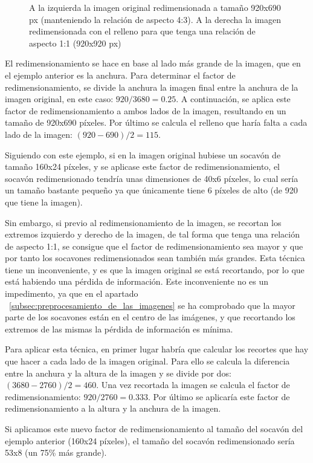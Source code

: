 \begin{figure}[H]
\begin{subfigure}[h]{0.45\linewidth}
	\end{subfigure}
	\caption{A la izquierda la imagen original redimensionada a tamaño 920x690 px (manteniendo la relación de aspecto 4:3). A la derecha la imagen redimensionada con el relleno para que tenga una relación de aspecto 1:1 (920x920 px)}
	\label{fig:imagedirectresize}
\end{figure}

El redimensionamiento se hace en base al lado más grande de la imagen, que en el ejemplo anterior es la anchura. Para determinar el factor de redimensionamiento, se divide la anchura la imagen final entre la anchura de la imagen original, en este caso: $920 / 3680 = 0.25$. A continuación, se aplica este factor de redimensionamiento a ambos lados de la imagen, resultando en un tamaño de 920x690 píxeles. Por último se calcula el relleno que haría falta a cada lado de la imagen: $(920 - 690) / 2 = 115$.

Siguiendo con este ejemplo, si en la imagen original hubiese un socavón de tamaño 160x24 píxeles, y se aplicase este factor de redimensionamiento, el socavón redimensionado tendría unas dimensiones de 40x6 píxeles, lo cual sería un tamaño bastante pequeño ya que únicamente tiene 6 píxeles de alto (de 920 que tiene la imagen).

Sin embargo, si previo al redimensionamiento de la imagen, se recortan los extremos izquierdo y derecho de la imagen, de tal forma que tenga una relación de aspecto 1:1, se consigue que el factor de redimensionamiento sea mayor y que por tanto los socavones redimensionados sean también más grandes. Esta técnica tiene un inconveniente, y es que la imagen original se está recortando, por lo que está habiendo una pérdida de información. Este inconveniente no es un impedimento, ya que en el apartado ~\ref{subsec:preprocesamiento_de_las_imagenes} se ha comprobado que la mayor parte de los socavones están en el centro de las imágenes, y que recortando los extremos de las mismas la pérdida de información es mínima.

Para aplicar esta técnica, en primer lugar habría que calcular los recortes que hay que hacer a cada lado de la imagen original. Para ello se calcula la diferencia entre la anchura y la altura de la imagen y se divide por dos: $(3680 - 2760) / 2 = 460$. Una vez recortada la imagen se calcula el factor de redimensionamiento: $920 / 2760 = 0.333$. Por último se aplicaría este factor de redimensionamiento a la altura y la anchura de la imagen.

Si aplicamos este nuevo factor de redimensionamiento al tamaño del socavón del ejemplo anterior (160x24 píxeles), el tamaño del socavón redimensionado sería 53x8 (un 75\% más grande).